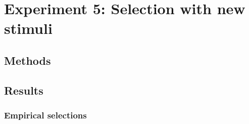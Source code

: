 \documentclass[11pt]{article}
\begin{document}

\section{Experiment 5: Selection with new stimuli}
\label{sec:experiment_5_selection_with_new_stimuli}

\subsection{Methods}
\label{sub:methods}

\subsection{Results}
\label{sub:results}

\subsubsection{Empirical selections}
\label{ssub:empirical_selections}
\end{document}
